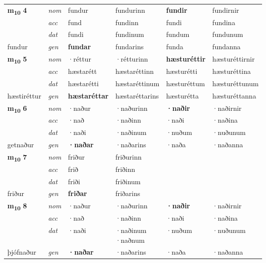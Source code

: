 \begin{longtable}[l]{X>{\footnotesize\itshape}XXXXX}
\multirow{3}{*}{{{\textbf{m{\textsubscript{10}}} \Large{\textbf{4}}}}}  
 & nom & fundur & fundurinn    & \textbf{fundir} & fundirnir  \\*
 & acc & fund  & fundinn   & fundi  & fundina \\*
 & dat & fundi & fundinum   & fundum & fundunum \\*
 {\footnotesize{fundur}} &  gen & \textbf{fundar}  & fundarins  & funda & fundanna \\
\cmidrule{1-6}


\multirow{3}{*}{{{\textbf{m{\textsubscript{10}}} \Large{\textbf{5}}}}}  
 & nom & ·réttur & ·rétturinn    & \textbf{hæsturéttir} & hæsturéttirnir  \\*
 & acc & hæstarétt  & hæstaréttinn   & hæsturétti  & hæsturéttina \\*
 & dat & hæstarétti & hæstaréttinum   & hæsturéttum & hæsturéttunum \\*
 {\footnotesize{hæstiréttur}} &  gen & \textbf{hæstaréttar}  & hæstaréttarins  & hæsturétta & hæsturéttanna \\
\cmidrule{1-6}


\multirow{3}{*}{{{\textbf{m{\textsubscript{10}}} \Large{\textbf{6}}}}}  
 & nom & ·naður & ·naðurinn    & \textbf{·naðir} & ·naðirnir  \\*
 & acc & ·nað  & ·naðinn   & ·naði  & ·naðina \\*
 & dat & ·naði & ·naðinum   & ·nuðum & ·nuðunum \\*
 {\footnotesize{getnaður}} &  gen & \textbf{·naðar}  & ·naðarins  & ·naða & ·naðanna \\
\cmidrule{1-6}


\multirow{3}{*}{{{\textbf{m{\textsubscript{10}}} \Large{\textbf{7}}}}}  
 & nom & friður & friðurinn    & \textbf{} &   \\*
 & acc & frið  & friðinn   &   &  \\*
 & dat & friði & friðinum   &  &  \\*
 {\footnotesize{friður}} &  gen & \textbf{friðar}  & friðarins  &  &  \\
\cmidrule{1-6}


\multirow{3}{*}{{{\textbf{m{\textsubscript{10}}} \Large{\textbf{8}}}}}  
 & nom & ·naður & ·naðurinn    & \textbf{·naðir} & ·naðirnir  \\*
 & acc & ·nað  & ·naðinn   & ·naði  & ·naðina \\*
 & dat & ·naði & \specialcell{·naðinum\\  ·naðnum}   & ·nuðum & ·nuðunum \\*
 {\footnotesize{þjófnaður}} &  gen & \textbf{·naðar}  & ·naðarins  & ·naða & ·naðanna \\
\cmidrule{1-6}



\end{longtable}
